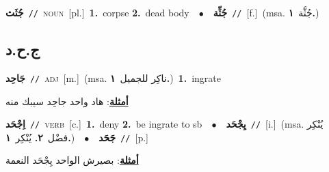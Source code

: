\documentclass[10pt,a4paper,twoside]{article} %
\begin{document}
\begin{multicols}{2}
{{{{{{{\setlength\topsep{0pt}\textbf{\foreignlanguage{arabic}{جُثَث}}\ {\color{gray}\texttt{//}\color{black}}\ \textsc{noun}\ [pl.]\ \textbf{1.}~corpse  \textbf{2.}~dead body\ \ $\bullet$\ \ \setlength\topsep{0pt}\textbf{\foreignlanguage{arabic}{جُثِّة}}\ {\color{gray}\texttt{//}\color{black}}\ [f.]\ \color{gray}(msa. \foreignlanguage{arabic}{جُثَّة}~\foreignlanguage{arabic}{\textbf{١.}})\color{black}\ 

\vspace{-3mm}
\subsection*{\color{blue}\foreignlanguage{arabic}{ج.ح.د}\color{blue}{}} 

{\setlength\topsep{0pt}\textbf{\foreignlanguage{arabic}{جَاحِد}}\ {\color{gray}\texttt{//}\color{black}}\ \textsc{adj}\ [m.]\ \color{gray}(msa. \foreignlanguage{arabic}{ناكِر للجميل}~\foreignlanguage{arabic}{\textbf{١.}})\color{black}\ \textbf{1.}~ingrate\  \begin{flushright}\color{gray}\foreignlanguage{arabic}{\textbf{\underline{\foreignlanguage{arabic}{أمثلة}}}: هاد واحد جاحِد سيبك منه}\end{flushright}\color{black}} \vspace{2mm}

{\setlength\topsep{0pt}\textbf{\foreignlanguage{arabic}{اِجْحَد}}\ {\color{gray}\texttt{//}\color{black}}\ \textsc{verb}\ [c.]\ \textbf{1.}~deny  \textbf{2.}~be ingrate to sb\ \ $\bullet$\ \ \setlength\topsep{0pt}\textbf{\foreignlanguage{arabic}{يِجْحَد}}\ {\color{gray}\texttt{//}\color{black}}\ [i.]\ \color{gray}(msa. \foreignlanguage{arabic}{يُنْكِر فضْل}~\foreignlanguage{arabic}{\textbf{٢.}}  \foreignlanguage{arabic}{يُنْكِر}~\foreignlanguage{arabic}{\textbf{١.}})\color{black}\ \ $\bullet$\ \ \setlength\topsep{0pt}\textbf{\foreignlanguage{arabic}{جَحَد}}\ {\color{gray}\texttt{//}\color{black}}\ [p.]\  \begin{flushright}\color{gray}\foreignlanguage{arabic}{\textbf{\underline{\foreignlanguage{arabic}{أمثلة}}}: بصيرش الواحد يِجْحَد النعمة}\end{flushright}\color{black}} \vspace{2mm}

}}}}}}}
\end{multicols}
\end{document}
